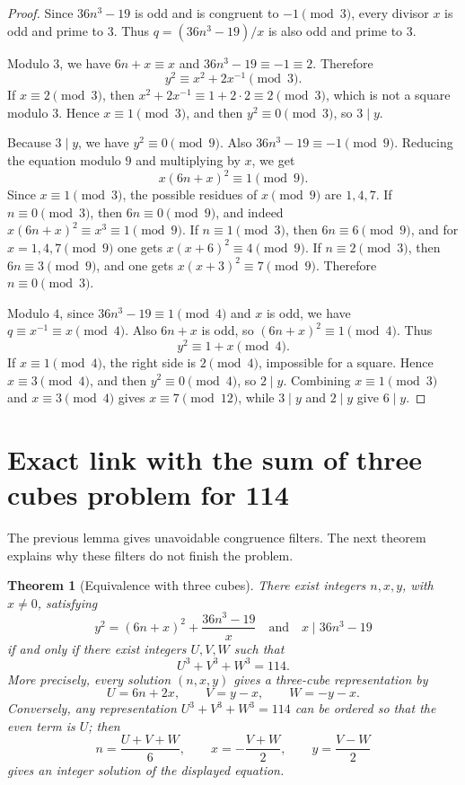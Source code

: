 \documentclass[11pt]{article}
\newtheorem{theorem}{Theorem}
\begin{document}
\begin{proof}
Since \(36n^3-19\) is odd and is congruent to \(-1\pmod 3\), every divisor
\(x\) is odd and prime to \(3\).  Thus \(q=(36n^3-19)/x\) is also odd and
prime to \(3\).

Modulo \(3\), we have \(6n+x\equiv x\) and \(36n^3-19\equiv -1\equiv 2\).
Therefore
\[
        y^2\equiv x^2+2x^{-1}\pmod 3.
\]
If \(x\equiv 2\pmod 3\), then \(x^2+2x^{-1}\equiv 1+2\cdot 2\equiv 2\pmod 3\),
which is not a square modulo \(3\). Hence \(x\equiv 1\pmod 3\), and then
\(y^2\equiv 0\pmod 3\), so \(3\mid y\).

Because \(3\mid y\), we have \(y^2\equiv 0\pmod 9\).  Also
\(36n^3-19\equiv -1\pmod 9\).  Reducing the equation modulo \(9\) and
multiplying by \(x\), we get
\[
        x(6n+x)^2\equiv 1\pmod 9.
\]
Since \(x\equiv 1\pmod 3\), the possible residues of \(x\pmod 9\) are
\(1,4,7\).  If \(n\equiv 0\pmod 3\), then \(6n\equiv 0\pmod 9\), and indeed
\(x(6n+x)^2\equiv x^3\equiv 1\pmod 9\). If \(n\equiv 1\pmod 3\), then
\(6n\equiv 6\pmod 9\), and for \(x=1,4,7\pmod 9\) one gets
\(x(x+6)^2\equiv 4\pmod 9\). If \(n\equiv 2\pmod 3\), then \(6n\equiv 3\pmod 9\),
and one gets \(x(x+3)^2\equiv 7\pmod 9\).  Therefore \(n\equiv 0\pmod 3\).

Modulo \(4\), since \(36n^3-19\equiv 1\pmod 4\) and \(x\) is odd, we have
\(q\equiv x^{-1}\equiv x\pmod 4\).  Also \(6n+x\) is odd, so
\((6n+x)^2\equiv 1\pmod 4\).  Thus
\[
        y^2\equiv 1+x\pmod 4.
\]
If \(x\equiv 1\pmod 4\), the right side is \(2\pmod 4\), impossible for a
square.  Hence \(x\equiv 3\pmod 4\), and then \(y^2\equiv 0\pmod 4\), so
\(2\mid y\).  Combining \(x\equiv 1\pmod 3\) and \(x\equiv 3\pmod 4\) gives
\(x\equiv 7\pmod {12}\), while \(3\mid y\) and \(2\mid y\) give \(6\mid y\).
\end{proof}

\section{Exact link with the sum of three cubes problem for 114}
The previous lemma gives unavoidable congruence filters.  The next theorem
explains why these filters do not finish the problem.

\begin{theorem}[Equivalence with three cubes]\label{thm:equiv}
There exist integers \(n,x,y\), with \(x\ne 0\), satisfying
\[
        y^2=(6n+x)^2+\frac{36n^3-19}{x}
        \quad\text{and}\quad x\mid 36n^3-19
\]
if and only if there exist integers \(U,V,W\) such that
\[
        U^3+V^3+W^3=114.
\]
More precisely, every solution \((n,x,y)\) gives a three-cube representation by
\[
        U=6n+2x,
        \qquad V=y-x,
        \qquad W=-y-x.
\]
Conversely, any representation \(U^3+V^3+W^3=114\) can be ordered so that the
even term is \(U\); then
\[
        n=\frac{U+V+W}{6},
        \qquad x=-\frac{V+W}{2},
        \qquad y=\frac{V-W}{2}
\]
gives an integer solution of the displayed equation.
\end{theorem}
\end{document}
